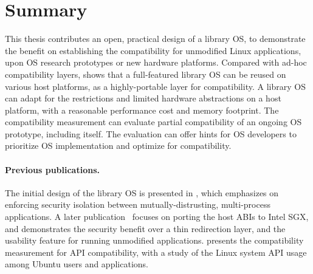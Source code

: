 


\section{Summary}

This thesis contributes an open, practical design of a library OS,
to demonstrate the benefit on establishing the compatibility for unmodified Linux applications, upon OS research prototypes or new hardware platforms.
Compared with ad-hoc compatibility layers, \graphene{} shows that
a full-featured library OS can be reused on various host platforms, as a highly-portable layer for compatibility.
A library OS can adapt for the restrictions and
limited hardware abstractions on a host platform, with a reasonable performance cost and memory footprint.
The compatibility measurement
can evaluate partial compatibility of an ongoing OS prototype, including \graphene{} itself. The evaluation can offer hints for OS developers to prioritize
OS implementation and optimize for compatibility.

\paragraph{Previous publications.}
The initial design of the \graphene{} library OS is presented in \cite{tsai14graphene}, which emphasizes on enforcing security isolation between mutually-distrusting, multi-process applications.
A later publication~\cite{tsai17graphene-sgx} focuses on porting the host ABIs
to Intel SGX, and demonstrates the security benefit 
over a thin redirection layer, and the usability feature for running unmodified applications.
\cite{tsai16apistudy} presents the compatibility measurement for API compatibility,
with a study of the Linux system API usage among Ubuntu users and applications.


